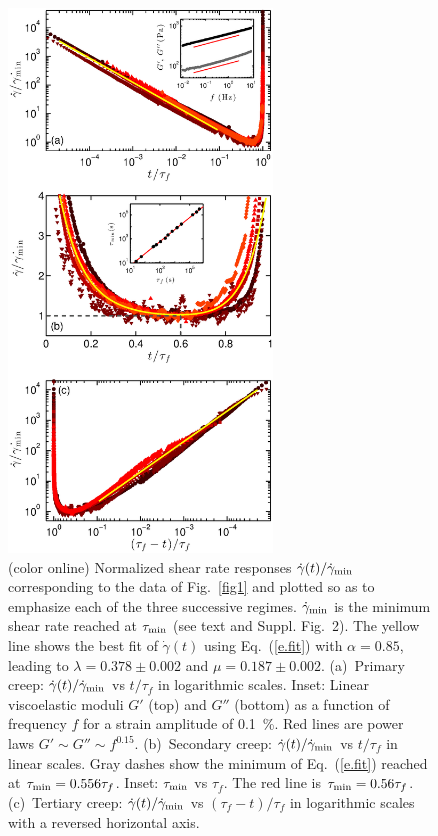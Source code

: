 \documentclass[twocolumn,superscriptaddress,showpacs,preprintnumbers,amsmath,amssymb,prl]{revtex4}
\newcommand\gp{\dot\gamma}
\newcommand\gpm{\dot\gamma_{\rm min}}
\newcommand\taum{\tau_{\rm min}}
\begin{document}
\begin{figure}
\centering
\includegraphics[width=7cm,clip]{Fig2.eps}
\caption{(color online) Normalized shear rate responses $\gp(t)/\gpm$ corresponding to the data of Fig.~\ref{fig1} and plotted so as to emphasize each of the three successive regimes. $\gpm$ is the minimum shear rate reached at $\taum$ (see text and Suppl. Fig.~2). The yellow line shows the best fit of $\gp(t)$ using Eq.~(\ref{e.fit}) with $\alpha=0.85$, leading to $\lambda=0.378\pm 0.002$ and $\mu=0.187\pm 0.002$. (a)~Primary creep: $\gp(t)/\gpm$ vs $t/\tau_f$ in logarithmic scales. Inset: Linear viscoelastic moduli $G'$ (top) and $G''$ (bottom) as a function of frequency $f$ for a strain amplitude of 0.1~\%. Red lines are power laws $G'\sim G''\sim f^{0.15}$. (b)~Secondary creep: $\gp(t)/\gpm$ vs $t/\tau_f$ in linear scales. Gray dashes show the minimum of Eq.~(\ref{e.fit}) reached at $\taum=0.556\tau_f$. Inset: $\taum$ vs $\tau_f$. The red line is $\taum=0.56\tau_f$. (c)~Tertiary creep: $\gp(t)/\gpm$ vs $(\tau_f-t)/\tau_f$ in logarithmic scales with a reversed horizontal axis.\label{fig2}}
\end{figure} 
\end{document}
